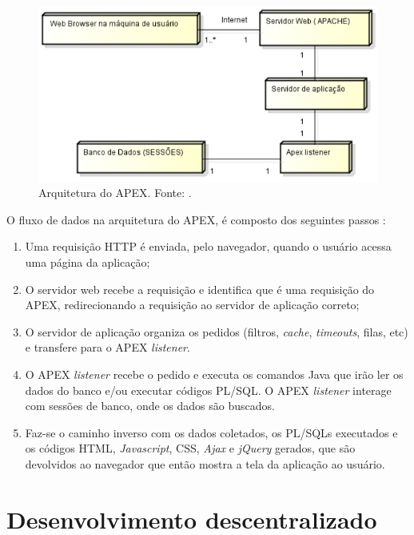 \begin{figure}[!htb]
	\centering
	\includegraphics[scale=0.6]{figuras/arquitetura_apex}
	\caption{Arquitetura do APEX. Fonte: \cite{ferreira2015}.}
	\label{arquitetura_apex}
\end{figure}

O fluxo de dados na arquitetura do APEX, é composto dos seguintes passos \cite{ferreira2015}:
\begin{enumerate}
	\item Uma requisição HTTP é enviada, pelo navegador, quando o usuário acessa uma página da aplicação;
	\item O servidor web recebe a requisição e identifica que é uma requisição do APEX, redirecionando a requisição ao servidor de aplicação correto;
	\item O servidor de aplicação organiza os pedidos (filtros, \textit{cache}, \textit{timeouts}, filas, etc) e transfere para o APEX \textit{listener}.
	\item O APEX \textit{listener} recebe o pedido e executa os comandos Java que irão ler os dados do banco e/ou executar códigos PL/SQL. O APEX \textit{listener} interage com sessões de banco, onde os dados são buscados.
	\item Faz-se o caminho inverso com os dados coletados, os PL/SQLs executados e os códigos HTML, \textit{Javascript}, CSS, \textit{Ajax} e \textit{jQuery} gerados, que são devolvidos ao navegador que então mostra a tela da aplicação ao usuário.
\end{enumerate}

\clearpage

\section{Desenvolvimento descentralizado}

